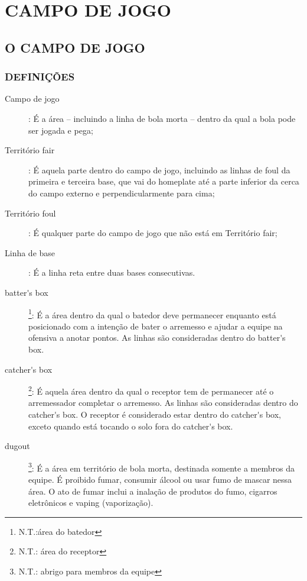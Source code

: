 \chapter{CAMPO DE JOGO}

	\section{O CAMPO DE JOGO}	

		\subsection{DEFINI\c{C}\~OES}
  
		\begin{description}
	
	\item[Campo de jogo]: \'E a \'area -- incluindo a linha de bola morta -- dentro da qual a bola pode ser jogada e pega;
	
	\item[Território \gls{fair}]: \'E aquela parte dentro do campo de jogo, incluindo as linhas de \gls{foul} da primeira e terceira base, que vai do \gls{homeplate} at\'e a parte inferior da cerca do campo externo e perpendicularmente para cima; 
	\item[Território \gls{foul}]: \'E qualquer parte do campo de jogo que n\~ao est\'a em Territ\'orio \gls{fair};
	
	\item[Linha de base]: \'E a linha reta entre duas bases consecutivas. 
	
	\item[\Gls{batter's box}]\footnote{ N.T.:\'area do batedor}: \'E a \'area dentro da qual o batedor deve permanecer enquanto est\'a posicionado com a inten\c{c}\~ao de bater o arremesso e ajudar a equipe na ofensiva a anotar pontos. As linhas s\~ao consideradas dentro do \Gls{batter's box}. 
	
	\item[\Gls{catcher's box}]\footnote{ N.T.: \'area do receptor}: \'E aquela \'area dentro da qual o receptor tem de permanecer at\'e o arremessador 
	completar o arremesso. As linhas s\~ao consideradas dentro do \gls{catcher's box}. 
	O receptor \'e considerado estar dentro do \gls{catcher's box}, exceto quando est\'a tocando o solo fora do \gls{catcher's box}. 
	
	\item[\Gls{dugout}]\footnote{N.T.: abrigo para membros da equipe}: \'E a \'area em territ\'orio de bola morta, destinada somente a membros da equipe. 
	\'E proibido fumar, consumir \'alcool ou usar fumo de mascar nessa \'area. O ato de fumar inclui a inala\c{c}\~ao de produtos do fumo, cigarros eletrônicos e \gls{vaping} (vaporiza\c{c}\~ao). 
	 

\end{description}
